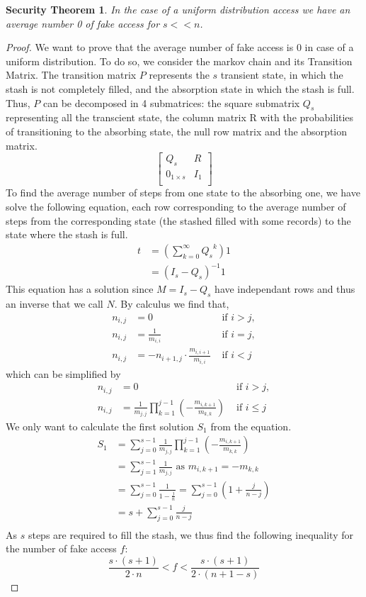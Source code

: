 \documentclass[english,oneside,twocolumn]{article}
\newtheorem{secthm}{Security Theorem}
\begin{document}
\begin{secthm}
In the case of a uniform distribution access we have an average number 0 of fake access for $s<<n$.\\
\end{secthm}
\begin{proof}
 We want to prove that the average number of fake access is 0 in case of a uniform distribution. To do so, we consider the markov chain and its Transition Matrix.
 The transition matrix $P$ represents the $s$ transient state, in which the stash is not completely filled, and the absorption state in which the stash is full.
Thus, $P$ can be decomposed in 4 submatrices: the square submatrix $Q_s$ representing all the transcient state, the column matrix R with the probabilities of transitioning to the absorbing state, the null row matrix and the absorption matrix.
\[
\begin{bmatrix}
   Q_s & R \\
   0_{1\times s}   & I_1 \\
\end{bmatrix}
\]
To find the average number of steps from one state to the absorbing one, we have solve the following equation, each row corresponding to the average number of steps from the corresponding state (the stashed filled with some records) to the state where the stash is full.
\begin{align*}
 t &= \left (\sum_{k=0}^{\infty} {Q_s}^k \right ) 1 \\
   &= (I_s -Q_s )^{-1} 1
\end{align*}
This equation has a solution since $M=I_s -Q_s$ have independant rows and thus an inverse that we call $N$.
By calculus we find that,
\begin{align*}
 n_{i,j} &= 0 &\text{ if } i>j,\\ 
 n_{i,j} &= \frac{1}{m_{i,i}} &\text{ if } i=j,\\
 n_{i,j} &= - n_{i+1,j } \cdot \frac{m_{i,i+1}}{m_{i,i}} &\text{ if } i<j 
\end{align*}
which can be simplified by
\begin{align*}
 n_{i,j} &= 0 &\text{ if } i>j,\\ 
 n_{i,j} &= \frac{1}{m_{j,j}} \prod_{k=1}^{j-1} \left ( - \frac{m_{i,k+1}}{m_{k,k}}\right ) &\text{ if } i\leq j
\end{align*}
We only want to calculate the first solution $S_1$ from the equation.
\begin{align*}
 S_1 &= \sum_{j=0}^{s-1} \frac{1}{m_{j,j}} \prod_{k=1}^{j-1} \left ( - \frac{m_{i,k+1}}{m_{k,k}}\right ) \\
     &= \sum_{j=1}^{s-1} \frac{1}{m_{j,j}} \text{ as } m_{i,k+1}= -m_{k,k} \\
     &= \sum_{j=0}^{s-1} \frac{1}{1-\frac{j}{n}} = \sum_{j=0}^{s-1} \left (1 + \frac{j}{n-j} \right ) \\
     &= s + \sum_{j=0}^{s-1} \frac{j}{n-j} \\   
\end{align*}
As $s$ steps are required to fill the stash, we thus find the following inequality for the number of fake access $f$:
$$ \frac{s \cdot (s+1)}{2 \cdot n} < f < \frac{s \cdot (s+1)}{2 \cdot (n+1-s)} $$
\end{proof}
\end{document}
